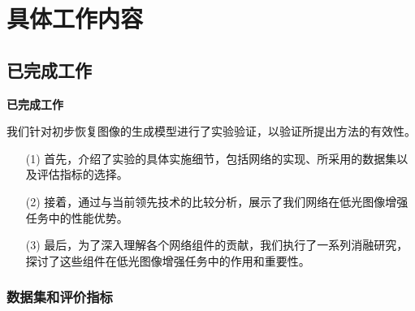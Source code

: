 \documentclass[CJK,aspectratio=169]{beamer}  %
\begin{document}
	\section{具体工作内容}
	
	\subsection{已完成工作}
	
	\begin{frame}
		{ \yahei \textbf{已完成工作}}
		
		{ \yahei 我们针对初步恢复图像的生成模型进行了实验验证，以验证所提出方法的有效性。}
		
		\begin{itemize}
			\item [(1)] 首先，介绍了实验的具体实施细节，包括网络的实现、所采用的数据集以及评估指标的选择。
			\item [(2)] 接着，通过与当前领先技术的比较分析，展示了我们网络在低光图像增强任务中的性能优势。
			\item [(3)] 最后，为了深入理解各个网络组件的贡献，我们执行了一系列消融研究，探讨了这些组件在低光图像增强任务中的作用和重要性。
		\end{itemize}
		
	\end{frame}
	
	
	\subsubsection{数据集和评价指标}
	
\end{document}
